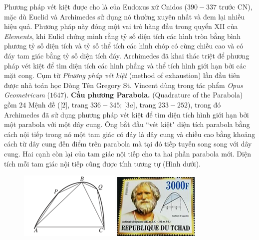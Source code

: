 \begin{multicols}{2}
\begin{figure}[H]
		\vspace*{-10pt}
	\end{figure}
	Phương pháp vét kiệt được cho là của Eudoxus xứ Cnidos ($390-337$ trước CN), mặc dù Euclid và Archimedes sử dụng nó thường xuyên nhất và đem lại nhiều hiệu quả. Phương pháp này đóng một vai trò hàng đầu trong quyển XII của \textit{Elements}, khi Eulid chứng minh rằng tỷ số diện tích các hình tròn bằng bình phương tỷ số diện tích và tỷ số thể tích các hình chóp có cùng chiều cao và có đáy tam giác bằng tỷ số diện tích đáy. Archimedes đã khai thác triệt để phương pháp vét kiệt để tìm diện tích các hình phẳng và thể tích hình giới hạn bởi các mặt cong. Cụm từ \textit{Phương pháp vét kiệt} (method of exhaustion) lần đầu tiên được nhà toán học Dòng Tên Gregory St. Vincent dùng trong tác phẩm \textit{Opus Geometricum} ($1647$).
	\vskip 0.1cm 
	\textbf{\color{lichsutoanhoc}Cầu phương Parabola.} (Quadrature of the Parabola) gồm $24$ Mệnh đề ([$2$], trang $336-345$; [$3a$], trang $233-252$), trong đó Archimedes đã sử dụng phương pháp vét kiệt để tìm diện tích hình giới hạn bởi một parabola với một dây cung. Ông bắt đầu ``vét kiệt" diện tích parabola bằng cách nội tiếp trong nó một tam giác có đáy là dây cung và chiều cao bằng khoảng cách từ dây cung đến điểm trên parabola mà tại đó tiếp tuyến song song với dây cung. Hai cạnh còn lại của tam giác nội tiếp cho ta hai phần parabola mới. Diện tích mỗi tam giác nội tiếp cũng được tính tương tự (Hình dưới).
	\begin{figure}[H]
		\vspace*{-5pt}
		\centering
		\captionsetup{labelformat= empty, justification=centering}
		\includegraphics[height=0.35\linewidth]{9}
		\includegraphics[height=0.35\linewidth]{9b}

\end{figure}
\end{multicols}
